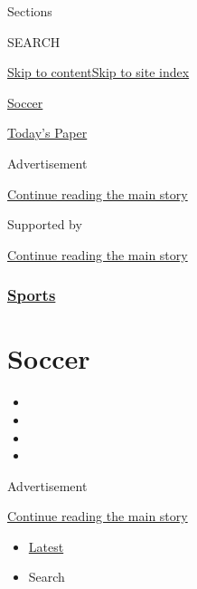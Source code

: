 Sections

SEARCH

\protect\hyperlink{site-content}{Skip to
content}\protect\hyperlink{site-index}{Skip to site index}

\href{https://www.nytimes.com/section/sports/soccer}{Soccer}

\href{https://myaccount.nytimes.com/auth/login?response_type=cookie\&client_id=vi}{}

\href{https://www.nytimes.com/section/todayspaper}{Today's Paper}

Advertisement

\protect\hyperlink{after-top}{Continue reading the main story}

Supported by

\protect\hyperlink{after-sponsor}{Continue reading the main story}

\hypertarget{sports}{%
\subsubsection{\texorpdfstring{\href{/section/sports}{Sports}}{Sports}}\label{sports}}

\hypertarget{soccer}{%
\section{Soccer}\label{soccer}}

\begin{itemize}
\item
\item
\item
\item
\end{itemize}

Advertisement

\protect\hyperlink{after-subheader}{Continue reading the main story}

\begin{itemize}
\tightlist
\item
  \protect\hyperlink{stream-panel}{Latest}
\item
  Search
\end{itemize}

